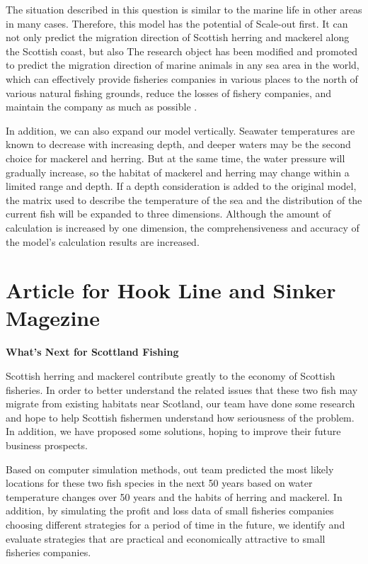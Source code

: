 \documentclass{mcmthesis}
\numberwithin{figure}{section}
\numberwithin{table}{section}
\begin{document}
The situation described in this question is similar to the marine life in other areas in many cases. Therefore, this model has the potential of Scale-out first. It can not only predict the migration direction of Scottish herring and mackerel along the Scottish coast, but also The research object has been modified and promoted to predict the migration direction of marine animals in any sea area in the world, which can effectively provide fisheries companies in various places to the north of various natural fishing grounds, reduce the losses of fishery companies, and maintain the company as much as possible .

In addition, we can also expand our model vertically. Seawater temperatures are known to decrease with increasing depth, and deeper waters may be the second choice for mackerel and herring. But at the same time, the water pressure will gradually increase, so the habitat of mackerel and herring may change within a limited range and depth. If a depth consideration is added to the original model, the matrix used to describe the temperature of the sea and the distribution of the current fish will be expanded to three dimensions. Although the amount of calculation is increased by one dimension, the comprehensiveness and accuracy of the model's calculation results are increased. 
\newpage
\section{Article for Hook Line and Sinker Magezine}
\begin{center}
\textbf{What's Next for Scottland Fishing}
\end{center}

Scottish herring and mackerel contribute greatly to the economy of Scottish fisheries. In order to better understand the related issues that these two fish may migrate from existing habitats near Scotland, our team have done some research and hope to help Scottish fishermen understand how seriousness of  the problem. In addition, we have proposed some solutions, hoping to improve their future business prospects.

Based on computer simulation methods, out team predicted the most likely locations for these two fish species in the next 50 years based on water temperature changes over 50 years and the habits of herring and mackerel. In addition, by simulating the profit and loss data of small fisheries companies choosing different strategies for a period of time in the future, we identify and evaluate strategies that are practical and economically attractive to small fisheries companies.
\end{document}

